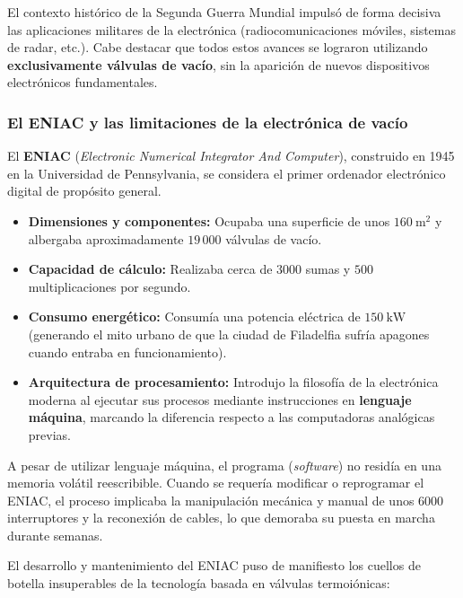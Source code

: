 El contexto histórico de la Segunda Guerra Mundial impulsó de forma decisiva las aplicaciones militares de la electrónica (radiocomunicaciones móviles, sistemas de radar, etc.). Cabe destacar que todos estos avances se lograron utilizando \textbf{exclusivamente válvulas de vacío}, sin la aparición de nuevos dispositivos electrónicos fundamentales.

\subsubsection{El ENIAC y las limitaciones de la electrónica de vacío}

El \textbf{ENIAC} (\textit{Electronic Numerical Integrator And Computer}), construido en 1945 en la Universidad de Pennsylvania, se considera el primer ordenador electrónico digital de propósito general.

\begin{concepto}
\begin{itemize}
    \item \textbf{Dimensiones y componentes:} Ocupaba una superficie de unos $\SI{160}{\metre\squared}$ y albergaba aproximadamente $19\,000$ válvulas de vacío.
    \item \textbf{Capacidad de cálculo:} Realizaba cerca de $3000$ sumas y $500$ multiplicaciones por segundo.
    \item \textbf{Consumo energético:} Consumía una potencia eléctrica de $\SI{150}{\kilo\watt}$ (generando el mito urbano de que la ciudad de Filadelfia sufría apagones cuando entraba en funcionamiento).
    \item \textbf{Arquitectura de procesamiento:} Introdujo la filosofía de la electrónica moderna al ejecutar sus procesos mediante instrucciones en \textbf{lenguaje máquina}, marcando la diferencia respecto a las computadoras analógicas previas.
\end{itemize}
\end{concepto}

A pesar de utilizar lenguaje máquina, el programa (\textit{software}) no residía en una memoria volátil reescribible. Cuando se requería modificar o reprogramar el ENIAC, el proceso implicaba la manipulación mecánica y manual de unos $6000$ interruptores y la reconexión de cables, lo que demoraba su puesta en marcha durante semanas.

El desarrollo y mantenimiento del ENIAC puso de manifiesto los cuellos de botella insuperables de la tecnología basada en válvulas termoiónicas:

